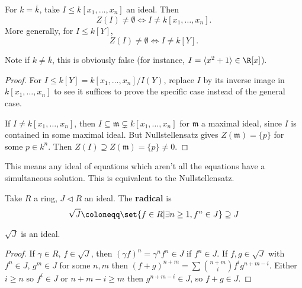 \documentclass{article}
\begin{document}
\color{black}
\begin{cor}
    For $k = \overline{k}$, take $I \leq k[x_1, \dotsc, x_n]$ an ideal.
    Then \begin{equation*}Z(I) \neq \emptyset \iff I \neq k[x_1, \dotsc, x_n].\end{equation*}
    More generally, for $I \leq k[Y]$, \begin{equation*}Z(I) \neq \emptyset \iff I \neq k[Y].\end{equation*}
\end{cor}
Note if $k \neq \overline{k}$, this is obviously false (for instance, $I=\langle x^2 + 1 \rangle \in \R[x]$).

\begin{proof}
    For $I \leq k[Y] = k[x_1, \dotsc, x_n]/I(Y)$, replace $I$ by its inverse image in $k[x_1, \dotsc, x_n]$ to see it suffices to prove the specific case instead of the general case.

    If $I \neq k[x_1, \dotsc, x_n]$, then $I \subseteq \mathfrak{m} \subsetneq k[x_1, \dotsc, x_n]$ for $\mathfrak{m}$ a maximal ideal, since $I$ is contained in some maximal ideal.
    But Nullstellensatz gives $Z(\mathfrak{m}) = \{p\}$ for some $p \in k^n$.
    Then $Z(I) \supseteq Z(\mathfrak{m}) = \{p\} \neq 0$.
\end{proof}

\begin{remark}
    This means any ideal of equations which aren't all the equations have a simultaneous solution.
    This is equivalent to the Nullstellensatz.
\end{remark}
\begin{defi}
    Take $R$ a ring, $J \lhd R$ an ideal.  The \textbf{radical} is
    \begin{equation*}
        \sqrt{J} \coloneqq \set{f \in R | \exists n \geq 1, f^n \in J } \supseteq J
    \end{equation*}
\end{defi}
\begin{lemma}
    $\sqrt{J}$ is an ideal.
\end{lemma}
\begin{proof}
    If $\gamma \in R$, $f \in \sqrt{J}$, then $(\gamma f)^n = \gamma^n f^n \in J$ if $f^n \in J$.
    If $f, g \in \sqrt{J}$ with $f^n \in J$, $g^m \in J$ for some $n, m$ then $(f+g)^{n+m} = \sum \binom{n+m}{i} f^i g^{n+m-i}$. Either $i \geq n$ so $f^i \in J$ or $n+m-i\geq m$ then $g^{n+m-i} \in J$, so $f+g \in J$.
\end{proof}
\end{document}
